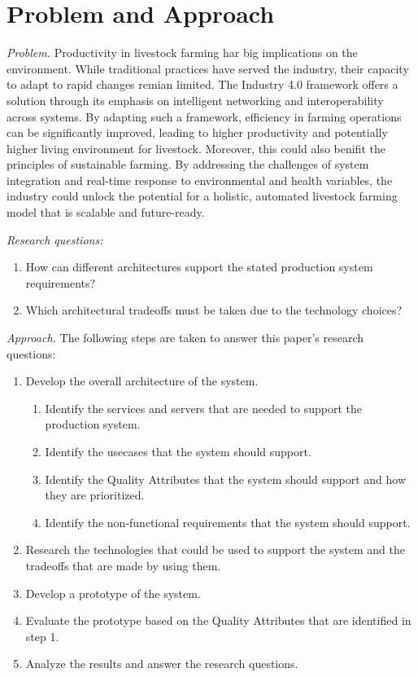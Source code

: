 \section{Problem and Approach}

\label{sec:problem}
\emph{Problem.}
Productivity in livestock farming har big implications on the environment. While traditional practices have served the industry, their capacity to adapt to rapid changes remian limited. The Industry 4.0 framework offers a solution through its emphasis on intelligent networking and interoperability across systems. By adapting such a framework, efficiency in farming operations can be significantly improved, leading to higher productivity and potentially higher living environment for livestock. Moreover, this could also benifit the principles of sustainable farming. By addressing the challenges of system integration and real-time response to environmental and health variables, the industry could unlock the potential for a holistic, automated livestock farming model that is scalable and future-ready. \vspace{1mm} \newline

\emph{Research questions:}
\vspace{1mm}
\begin{enumerate}
    \item How can different architectures support the stated production system requirements?
    \item Which architectural tradeoffs must be taken due to the technology choices?
\end{enumerate}
\vspace{4mm}

\emph{Approach.}
The following steps are taken to answer this paper's research questions:
\vspace{1mm}
\begin{enumerate}
    \item Develop the overall architecture of the system.
          \begin{enumerate}
              \item Identify the services and servers that are needed to support the production system.
              \item Identify the usecases that the system should support.
              \item Identify the Quality Attributes that the system should support and how they are prioritized.
              \item Identify the non-functional requirements that the system should support.
          \end{enumerate}
    \item Research the technologies that could be used to support the system and the tradeoffs that are made by using them.
    \item Develop a prototype of the system.
    \item Evaluate the prototype based on the Quality Attributes that are identified in step 1.
    \item Analyze the results and answer the research questions.
\end{enumerate}

